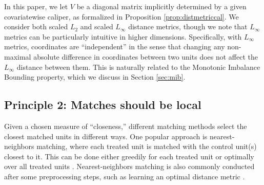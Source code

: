 \documentclass{article}
\begin{document}
In this paper, we let $V$ be a diagonal matrix implicitly determined by a given covariatewise caliper, as formalized in Proposition \ref{prop:distmetriccal}.
We consider both scaled $L_2$ and scaled $L_\infty$ distance metrics, 
though we note that $L_\infty$ metrics can be particularly intuitive in higher dimensions.
Specifically, with $L_\infty$ metrics, coordinates are ``independent'' in the sense that changing any non-maximal absolute difference in coordinates between two units does not affect the $L_\infty$ distance between them.
This is naturally related to the Monotonic Imbalance Bounding \citep[MIB; ][]{iacus2011multivariate} property, which we discuss in Section \ref{sec:mib}.



\subsection{Principle 2: Matches should be local}
\label{sec:close}

Given a chosen measure of ``closeness,'' different matching methods select the closest matched units in different ways.
One popular approach is nearest-neighbors matching, where each treated unit is matched with the control unit(s) closest to it.
This can be done either greedily for each treated unit \citep{rubin1973matching} or optimally over all treated units \citep{rosenbaum1989optimal}.
Nearest-neighbors matching is also commonly conducted after some preprocessing steps, such as learning an optimal distance metric \citep{diamond2013genetic, parikh2022malts}.
\end{document}
